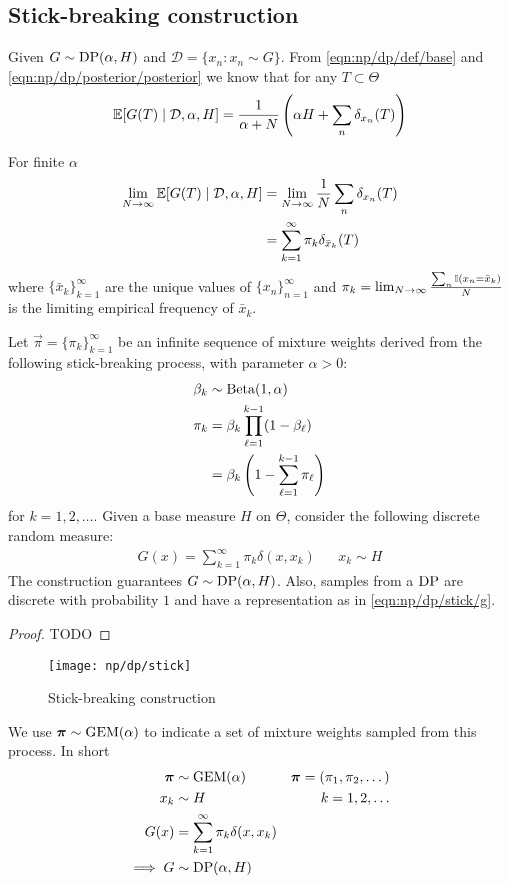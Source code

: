 \subsection{Stick-breaking construction}
Given $G \sim \operatorname{DP}(\alpha, H)$ and $\mathcal D = \{x_n: x_n \sim G\}$. From \eqref{eqn:np/dp/def/base} and \eqref{eqn:np/dp/posterior/posterior} we know that for any $T \subset \Theta$
\begin{equation}
	\operatorname{\mathbb{E}}[G(T) \mid \mathcal D, \alpha, H] = \frac{1}{\alpha + N} \left(\alpha H + \sum_n \delta_{x_n}(T)\right)
\end{equation}

For finite $\alpha$
\begin{align*}
	\lim_{N \to \infty} \operatorname{\mathbb{E}}[G(T) \mid \mathcal D, \alpha, H] &= \lim_{N \to \infty} \frac{1}{N} \sum_n \delta_{x_n}(T) \\
															&= \sum_{k = 1}^\infty \pi_k \delta_{\bar x_k}(T)
\end{align*}
where $\{\bar x_k\}_{k = 1}^\infty$ are the unique values of $\{x_n\}_{n = 1}^\infty$ and $\pi_k = \lim_{N \to \infty} \frac{\sum_n \operatorname{\mathbb I}(x_n = \bar x_k)}{N}$ is the limiting empirical frequency of $\bar x_k$.

\begin{theorem}
	Let $\vec \pi = \{\pi_k\}_{k = 1}^\infty$ be an infinite sequence of mixture weights derived from the following stick-breaking process, with parameter $\alpha > 0$:
	\begin{align}
		\beta_k		&\sim \operatorname{Beta}(1, \alpha) \\
		\pi_k		&= \beta_k \prod_{\ell = 1}^{k - 1} (1 - \beta_\ell) \\
					&= \beta_k \left(1 - \sum_{\ell = 1}^{k - 1} \pi_\ell\right)
	\end{align}
	for $k = 1, 2, \dotsc$. Given a base measure $H$ on $\Theta$, consider the following discrete random measure:
	\begin{align}
		G(x) = \sum_{k = 1}^\infty \pi_k \delta(x, x_k)		&& x_k \sim H \label{eqn:np/dp/stick/g}
	\end{align}
	The construction guarantees $G \sim \operatorname{DP}(\alpha, H)$. Also, samples from a $\operatorname{DP}$ are discrete with probability $1$ and have a representation as in \eqref{eqn:np/dp/stick/g}.
\end{theorem}

\begin{proof}
	TODO
\end{proof}

\begin{figure}[ht!]
	\centering
	\texttt{[image: np/dp/stick]}
	\caption{Stick-breaking construction}
\end{figure}

We use $\boldsymbol{\mathbf{\pi}} \sim \operatorname{GEM}(\alpha)$ to indicate a set of mixture weights sampled from this process. In short
\begin{align*}
	\boldsymbol{\mathbf{\pi}} 	&\sim \operatorname{GEM}(\alpha)	& \boldsymbol{\mathbf{\pi}} = (\pi_1, \pi_2, \dotsc)\\
	x_k			&\sim H 			& k = 1, 2, \dotsc \\
	G(x) 		&= \sum_{k = 1}^\infty \pi_k \delta(x, x_k) \\
	\implies G 	&\sim \operatorname{DP}(\alpha, H)
\end{align*}